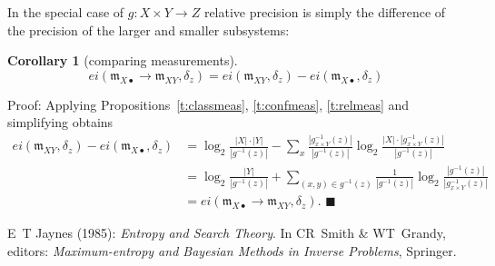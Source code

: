 \documentclass[12pt]{article}
\newcommand{\fm}{{\mathfrak m}}
\newtheorem{cor}[thm]{Corollary}
\theoremstyle{remark}
\begin{document}
In the special case of $g:X\times Y\rightarrow Z$ relative 
precision is simply the difference of the precision of the 
larger and smaller subsystems:

\begin{cor}[comparing measurements]
	\label{t:diffmeas}
	\begin{equation*}
		ei(\fm_{X\bullet}\rightarrow \fm_{XY},\delta_z) = 
        ei(\fm_{XY},\delta_z) -ei(\fm_{X\bullet},\delta_z)
	\end{equation*}
\end{cor}

\noindent
Proof: Applying Propositions~\ref{t:classmeas}, 
\ref{t:confmeas}, \ref{t:relmeas} and simplifying obtains
\begin{align*}
    ei(\fm_{XY},\delta_z) -ei(\fm_{X\bullet},\delta_z) 
	& = \log_2\frac{|X|\cdot|Y|}{|g^{-1}(z)|}
	-\sum_x \frac{|g^{-1}_{x\times Y}(z)|}{|g^{-1}(z)|}\log_2\frac{|X|\cdot |g^{-1}_{x\times Y}(z)|}{|g^{-1}(z)|}\\
	& = \log_2 \frac{|Y|}{|g^{-1}(z)|}+\sum_{(x,y)\in g^{-1}(z)}\frac{1}{|g^{-1}(z)|}
	\log_2 \frac{|g^{-1}(z)|}{|g^{-1}_{x\times Y}(z)|} \\
	& = ei(\fm_{X\bullet}\rightarrow \fm_{XY},\delta_z).
	\,\,\blacksquare
\end{align*}

\begin{thebibliography}{10}
\providecommand{\bibitemdeclare}[2]{}
\providecommand{\urlprefix}{Available at }
\providecommand{\url}[1]{\texttt{#1}}
\providecommand{\href}[2]{\texttt{#2}}
\providecommand{\urlalt}[2]{\href{#1}{#2}}
\providecommand{\doi}[1]{doi:\urlalt{http://dx.doi.org/#1}{#1}}
\providecommand{\bibinfo}[2]{#2}

\bibinfo{author}{E~T Jaynes} (\bibinfo{year}{1985}):
  \emph{\bibinfo{title}{Entropy and {S}earch {T}heory}}.
\newblock In \bibinfo{editor}{CR~Smith} \& \bibinfo{editor}{WT~Grandy},
  editors: {\sl \bibinfo{booktitle}{Maximum-entropy and {B}ayesian {M}ethods in
  {I}nverse {P}roblems}}, \bibinfo{publisher}{Springer}.

\end{thebibliography}
\end{document}
